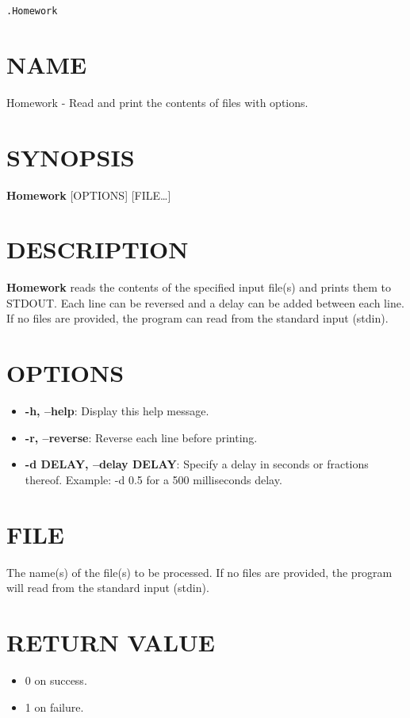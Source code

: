 \documentclass[11pt]{article}
\author{Christian}
\date{\today}
\title{}
\begin{document}
\texttt{.Homework}
\section{NAME}
\label{sec:org5f1dc26}

Homework - Read and print the contents of files with options.
\section{SYNOPSIS}
\label{sec:org691cf6e}

\textbf{Homework} [OPTIONS] [FILE\ldots{}]
\section{DESCRIPTION}
\label{sec:orga2b8332}

\textbf{Homework} reads the contents of the specified input file(s) and prints them to STDOUT. Each line can be reversed and a delay can be added between each line. If no files are provided, the program can read from the standard input (stdin).
\section{OPTIONS}
\label{sec:org113dbbf}

\begin{itemize}
\item \textbf{\textbf{-h, --help}}: Display this help message.
\item \textbf{\textbf{-r, --reverse}}: Reverse each line before printing.
\item \textbf{\textbf{-d DELAY, --delay DELAY}}: Specify a delay in seconds or fractions thereof. Example: -d 0.5 for a 500 milliseconds delay.
\end{itemize}
\section{FILE}
\label{sec:org28756a4}

The name(s) of the file(s) to be processed. If no files are provided, the program will read from the standard input (stdin).
\section{RETURN VALUE}
\label{sec:orgf9ec34b}

\begin{itemize}
\item 0 on success.
\item 1 on failure.
\end{itemize}
\end{document}
